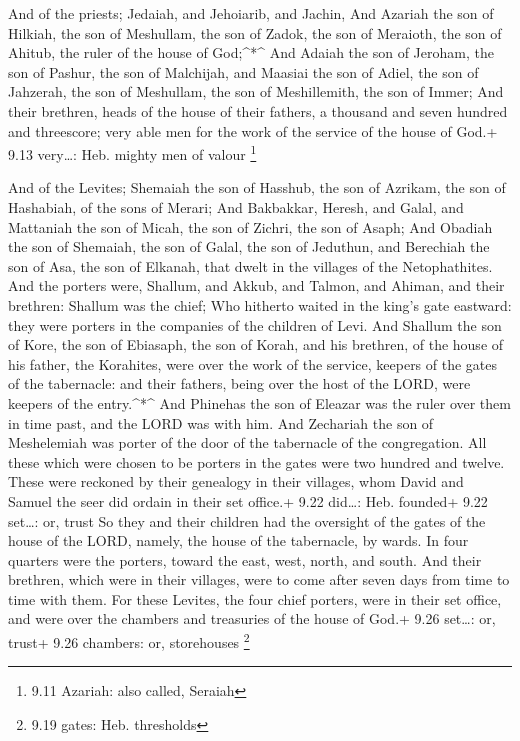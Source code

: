  And of the priests; Jedaiah, and Jehoiarib, and Jachin,
 And Azariah the son of Hilkiah, the son of Meshullam, the
son of Zadok, the son of Meraioth, the son of Ahitub, the ruler of the
house of God;\^{}*\^{}  And Adaiah the son of Jeroham, the
son of Pashur, the son of Malchijah, and Maasiai the son of Adiel, the
son of Jahzerah, the son of Meshullam, the son of Meshillemith, the son
of Immer;  And their brethren, heads of the house of their
fathers, a thousand and seven hundred and threescore; very able men for
the work of the service of the house of God.+ 9.13 very\ldots: Heb.
mighty men of valour \footnote{9.11 Azariah: also called, Seraiah}

 And of the Levites; Shemaiah the son of Hasshub, the son
of Azrikam, the son of Hashabiah, of the sons of Merari; 
And Bakbakkar, Heresh, and Galal, and Mattaniah the son of Micah, the
son of Zichri, the son of Asaph;  And Obadiah the son of
Shemaiah, the son of Galal, the son of Jeduthun, and Berechiah the son
of Asa, the son of Elkanah, that dwelt in the villages of the
Netophathites.  And the porters were, Shallum, and Akkub,
and Talmon, and Ahiman, and their brethren: Shallum was the chief;
 Who hitherto waited in the king's gate eastward: they were
porters in the companies of the children of Levi.  And
Shallum the son of Kore, the son of Ebiasaph, the son of Korah, and his
brethren, of the house of his father, the Korahites, were over the work
of the service, keepers of the gates of the tabernacle: and their
fathers, being over the host of the LORD, were keepers of the
entry.\^{}*\^{}  And Phinehas the son of Eleazar was the
ruler over them in time past, and the LORD was with him. 
And Zechariah the son of Meshelemiah was porter of the door of the
tabernacle of the congregation.  All these which were
chosen to be porters in the gates were two hundred and twelve. These
were reckoned by their genealogy in their villages, whom David and
Samuel the seer did ordain in their set office.+ 9.22 did\ldots: Heb.
founded+ 9.22 set\ldots: or, trust  So they and their
children had the oversight of the gates of the house of the LORD,
namely, the house of the tabernacle, by wards.  In four
quarters were the porters, toward the east, west, north, and south.
 And their brethren, which were in their villages, were to
come after seven days from time to time with them.  For
these Levites, the four chief porters, were in their set office, and
were over the chambers and treasuries of the house of God.+ 9.26
set\ldots: or, trust+ 9.26 chambers: or, storehouses \footnote{9.19
  gates: Heb. thresholds}

